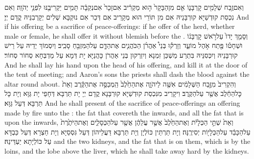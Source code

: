 \newperek
{}%
{וְאִם\maqqaf זֶ֥בַח שְׁלָמִ֖ים קׇרְבָּנ֑וֹ אִ֤ם מִן\maqqaf הַבָּקָר֙ ה֣וּא מַקְרִ֔יב אִם\maqqaf זָכָר֙ אִם\maqqaf נְקֵבָ֔ה תָּמִ֥ים יַקְרִיבֶ֖נּוּ לִפְנֵ֥י יְהֹוָֽה׃}
{וְאִם נִכְסַת קוּדְשַׁיָּא קוּרְבָּנֵיהּ אִם מִן תּוֹרֵי הוּא מְקָרֵיב אִם דְּכַר אִם נוּקְבָּא שְׁלִים יְקָרְבִנֵּיהּ קֳדָם יְיָ׃}
{And if his offering be a sacrifice of peace-offerings: if he offer of the herd, whether male or female, he shall offer it without blemish before the \lord.}{}
{וְסָמַ֤ךְ יָדוֹ֙ עַל\maqqaf רֹ֣אשׁ קׇרְבָּנ֔וֹ וּשְׁחָט֕וֹ פֶּ֖תַח אֹ֣הֶל מוֹעֵ֑ד וְזָרְק֡וּ בְּנֵי֩ אַהֲרֹ֨ן הַכֹּהֲנִ֧ים אֶת\maqqaf הַדָּ֛ם עַל\maqqaf הַמִּזְבֵּ֖חַ סָבִֽיב׃}
{וְיִסְמוֹךְ יְדֵיהּ עַל רֵישׁ קוּרְבָּנֵיהּ וְיִכְּסִנֵּיהּ בִּתְרַע מַשְׁכַּן זִמְנָא וְיִזְרְקוּן בְּנֵי אַהֲרֹן כָּהֲנַיָּא יָת דְּמָא עַל מַדְבְּחָא סְחוֹר סְחוֹר׃}
{And he shall lay his hand upon the head of his offering, and kill it at the door of the tent of meeting; and Aaron’s sons the priests shall dash the blood against the altar round about.}{}
{וְהִקְרִיב֙ מִזֶּ֣בַח הַשְּׁלָמִ֔ים אִשֶּׁ֖ה לַיהֹוָ֑ה אֶת\maqqaf הַחֵ֙לֶב֙ הַֽמְכַסֶּ֣ה אֶת\maqqaf הַקֶּ֔רֶב וְאֵת֙ כׇּל\maqqaf הַחֵ֔לֶב אֲשֶׁ֖ר עַל\maqqaf הַקֶּֽרֶב׃}
{וִיקָרֵיב מִנִּכְסַת קוּדְשַׁיָּא קוּרְבָּנָא קֳדָם יְיָ יָת תַּרְבָּא דְּחָפֵי יָת גַּוָּא וְיָת כָּל תַּרְבָּא דְּעַל גַּוָּא׃}
{And he shall present of the sacrifice of peace-offerings an offering made by fire unto the \lord: the fat that covereth the inwards, and all the fat that is upon the inwards,}{}
{וְאֵת֙ שְׁתֵּ֣י הַכְּלָיֹ֔ת וְאֶת\maqqaf הַחֵ֙לֶב֙ אֲשֶׁ֣ר עֲלֵהֶ֔ן אֲשֶׁ֖ר עַל\maqqaf הַכְּסָלִ֑ים וְאֶת\maqqaf הַיֹּתֶ֙רֶת֙ עַל\maqqaf הַכָּבֵ֔ד עַל\maqqaf הַכְּלָי֖וֹת יְסִירֶֽנָּה׃}
{וְיָת תַּרְתֵּין כּוֹלְיָן וְיָת תַּרְבָּא דַּעֲלֵיהוֹן דְּעַל גִּסְסַיָּא וְיָת חַצְרָא דְּעַל כַּבְדָּא עַל כּוֹלְיָתָא יַעְדֵּינַהּ׃}
{and the two kidneys, and the fat that is on them, which is by the loins, and the lobe above the liver, which he shall take away hard by the kidneys.}{}
